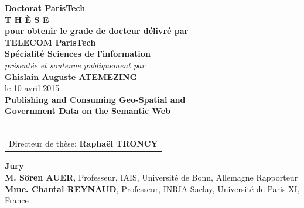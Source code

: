 \begin{titlepage}
\begin{center}
%
\vspace{.5cm}
%
%
%
%
%
%
\vspace{1.0cm}
%
%
%
{\LARGE {\bf Doctorat ParisTech}}\\
\vspace{1.1cm}
{\LARGE {\bf T H È S E}}\\
\vspace{0.5cm}
{\normalsize {\bf pour obtenir le grade de docteur délivré par}}\\
%
%
%
\vspace{.9cm}
%
%
%
%
{\LARGE {\bf TELECOM ParisTech}}\\
\vspace{0.6cm}
{\Large {\bf Spécialité \og Sciences de l'information \fg}}\\
%
%
%
\vspace{.8cm}
%
%
%
{\normalsize {\it présentée et soutenue publiquement par}}\\
\vspace{0.7cm}
{\Large {\bf Ghislain Auguste ATEMEZING}}\\
\vspace{0.24cm}
{\normalsize le 10 avril 2015}\\
%
%
%
\vfill
%
%
%
\textcolor[RGB]{191,18,56}{
\noindent
{\LARGE {\bf Publishing and Consuming Geo-Spatial and \\[.6cm]Government Data on the Semantic Web}}\\
}
%
%
\vfill~\vfill
%
%
%
{\normalsize
\begin{tabular}{c}
Directeur de thèse:					{\bf Raphaël TRONCY}\\
\end{tabular}
}
\end{center}
%
%
%
\vfill
%
%
%
\flushleft
\begin{minipage}{.9\textwidth}	%
{\bf Jury}\\
{\bf M. Sören AUER}, {\small Professeur, IAIS, Université de Bonn, Allemagne}
	\hfill Rapporteur\\
{\bf Mme. Chantal REYNAUD}, {\small Professeur, INRIA Saclay, Université de Paris XI, France}

\end{minipage}
\end{titlepage}
